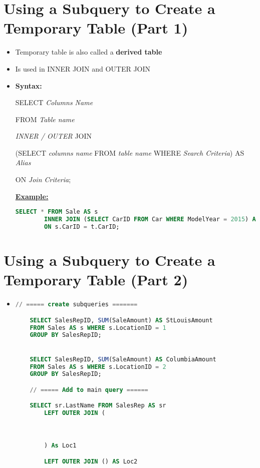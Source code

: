 \documentclass[12pt]{article}
\begin{document}
\bigskip

\section{Using a Subquery to Create a Temporary Table (Part 1)}

\bigskip


\begin{itemize}
    \item Temporary table is also called a \textbf{derived table}
    \item Is used in INNER JOIN and OUTER JOIN
    \item \textbf{Syntax:}

    SELECT \textit{Columns Name}

    FROM \textit{Table name}

    \textit{INNER / OUTER} JOIN

    (SELECT \textit{columns name} FROM \textit{table name} WHERE \textit{Search Criteria}) AS \textit{Alias}

    ON \textit{Join Criteria};

    \bigskip

    \underline{\textbf{Example:}}

    \bigskip

    \begin{lstlisting}[language=SQL]
    SELECT * FROM Sale AS s
        INNER JOIN (SELECT CarID FROM Car WHERE ModelYear = 2015) AS t
        ON s.CarID = t.CarID;
    \end{lstlisting}
\end{itemize}

\bigskip

\section{Using a Subquery to Create a Temporary Table (Part 2)}

\bigskip


\begin{itemize}
    \item

    \begin{lstlisting}[language=SQL]
    // ===== create subqueries =======

    SELECT SalesRepID, SUM(SaleAmount) AS StLouisAmount
    FROM Sales AS s WHERE s.LocationID = 1
    GROUP BY SalesRepID;


    SELECT SalesRepID, SUM(SaleAmount) AS ColumbiaAmount
    FROM Sales AS s WHERE s.LocationID = 2
    GROUP BY SalesRepID;

    // ===== Add to main query ======

    SELECT sr.LastName FROM SalesRep AS sr
        LEFT OUTER JOIN (



        ) As Loc1

        LEFT OUTER JOIN () AS Loc2


    \end{lstlisting}
\end{itemize}
\end{document}
